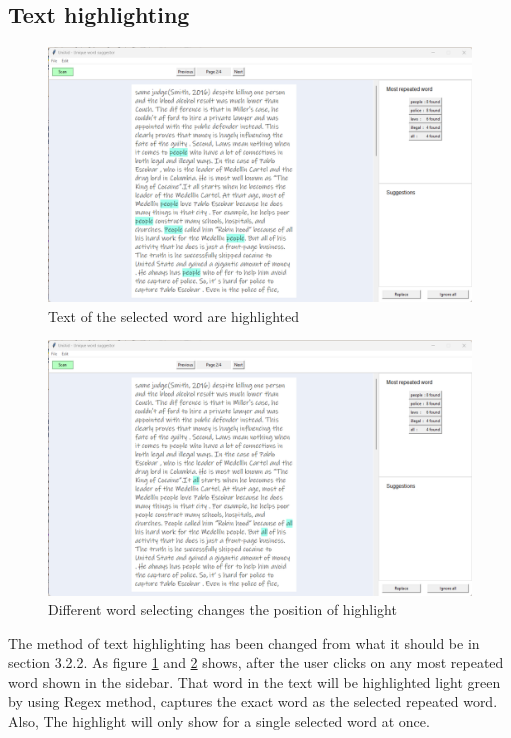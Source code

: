 \documentclass[12pt,oneside,openright,a4paper]{cpe-english-project}
\begin{document}
\subsection{Text highlighting}
\begin{figure}[!h]\centering
\includegraphics[width=15cm]{./img/chp4/Highlight1.png}
\caption{Text of the selected word are highlighted}\label{fig:high1}
\end{figure}
\begin{figure}[!h]\centering
\includegraphics[width=15cm]{./img/chp4/Highlight2.png}
\caption{Different word selecting changes the position of highlight}\label{fig:high2}
\end{figure}
The method of text highlighting has been changed from what it should be in section 3.2.2. As figure \ref{fig:high1} and \ref{fig:high2} shows, after the user clicks on any most repeated word shown in the sidebar. That word in the text will be highlighted light green by using Regex method, captures the exact word as the selected repeated word. Also, The highlight will only show for a single selected word at once.
\end{document}

